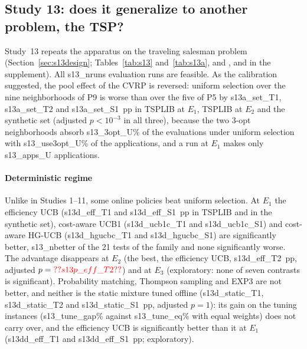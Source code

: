 \subsection{Study 13: does it generalize to another problem, the TSP?}\label{sec:s13}
Study~13 repeats the apparatus on the traveling salesman problem (Section~\ref{sec:s13design}; Tables~\ref{tab:s13} and~\ref{tab:s13a}, and ,  and  in the supplement). All \num{s13_nruns} evaluation runs are feasible. As the calibration suggested, the pool effect of the CVRP is reversed: uniform selection over the nine neighborhoods of P9 is worse than over the five of P5 by \num{s13a_set_T1}, \num{s13a_set_T2} and \num{s13a_set_S1}~pp in TSPLIB at $E_1$, TSPLIB at $E_2$ and the synthetic set (adjusted $p<10^{-3}$ in all three), because the two 3-opt neighborhoods absorb \num{s13_3opt_U}\% of the evaluations under uniform selection with \num{s13_use3opt_U}\% of the applications, and a run at $E_1$ makes only \num{s13_apps_U} applications.



\paragraph{Deterministic regime} Unlike in Studies 1--11, some online policies beat uniform selection. At $E_1$ the efficiency UCB (\num{s13d_eff_T1} and \num{s13d_eff_S1}~pp in TSPLIB and in the synthetic set), cost-aware UCB1 (\num{s13d_ucb1c_T1} and \num{s13d_ucb1c_S1}) and cost-aware HG-UCB (\num{s13d_hgucbc_T1} and \num{s13d_hgucbc_S1}) are significantly better, \num{s13_nbetter} of the 21 tests of the family and none significantly worse. The advantage disappears at $E_2$ (the best, the efficiency UCB, \num{s13d_eff_T2}~pp, adjusted $p=\num{s13p_eff_T2}$) and at $E_3$ (exploratory: none of seven contrasts is significant). Probability matching, Thompson sampling and EXP3 are not better, and neither is the static mixture tuned offline (\num{s13d_static_T1}, \num{s13d_static_T2} and \num{s13d_static_S1}~pp, adjusted $p=1$): its gain on the tuning instances (\num{s13_tune_gap}\% against \num{s13_tune_eq}\% with equal weights) does not carry over, and the efficiency UCB is significantly better than it at $E_1$ (\num{s13dd_eff_T1} and \num{s13dd_eff_S1}~pp; exploratory).

